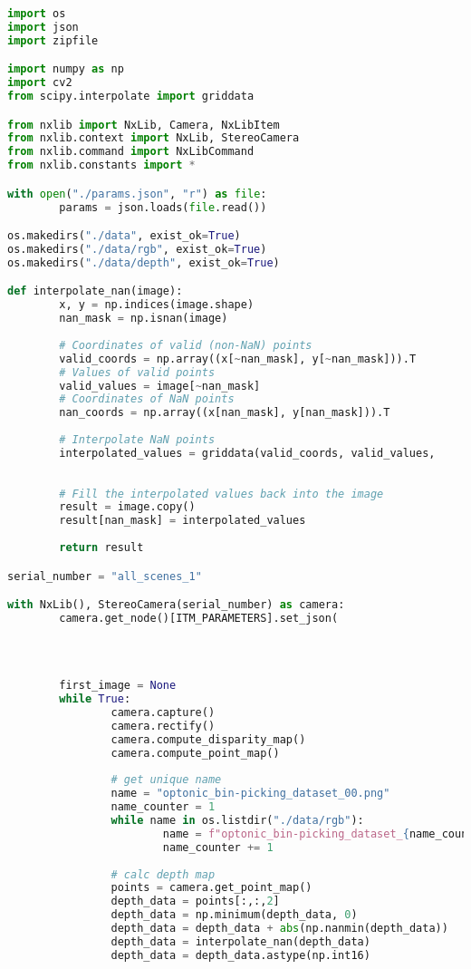 	\clearpage
	\begin{lstlisting}[language=Python,caption=Capturing images from a file camera with depth image scaling using Ensenso Software from Optonic GmbH \cite{optonic}, label=lst:file-camera]
import os
import json
import zipfile

import numpy as np
import cv2
from scipy.interpolate import griddata

from nxlib import NxLib, Camera, NxLibItem
from nxlib.context import NxLib, StereoCamera
from nxlib.command import NxLibCommand
from nxlib.constants import *

with open("./params.json", "r") as file:
		params = json.loads(file.read())

os.makedirs("./data", exist_ok=True)
os.makedirs("./data/rgb", exist_ok=True)
os.makedirs("./data/depth", exist_ok=True)

def interpolate_nan(image):
		x, y = np.indices(image.shape)
		nan_mask = np.isnan(image)
		
		# Coordinates of valid (non-NaN) points
		valid_coords = np.array((x[~nan_mask], y[~nan_mask])).T
		# Values of valid points
		valid_values = image[~nan_mask]
		# Coordinates of NaN points
		nan_coords = np.array((x[nan_mask], y[nan_mask])).T
		
		# Interpolate NaN points
		interpolated_values = griddata(valid_coords, valid_values,
																				nan_coords, method='linear')
		
		# Fill the interpolated values back into the image
		result = image.copy()
		result[nan_mask] = interpolated_values
		
		return result

serial_number = "all_scenes_1"

with NxLib(), StereoCamera(serial_number) as camera:
		camera.get_node()[ITM_PARAMETERS].set_json(
																					json.dumps(params[ITM_PARAMETERS]), 
																					True
																				)
		
		first_image = None
		while True:
				camera.capture()
				camera.rectify()
				camera.compute_disparity_map()
				camera.compute_point_map()
				
				# get unique name
				name = "optonic_bin-picking_dataset_00.png"
				name_counter = 1
				while name in os.listdir("./data/rgb"):
						name = f"optonic_bin-picking_dataset_{name_counter:02}.png"
						name_counter += 1
				
				# calc depth map
				points = camera.get_point_map()
				depth_data = points[:,:,2]
				depth_data = np.minimum(depth_data, 0)
				depth_data = depth_data + abs(np.nanmin(depth_data))
				depth_data = interpolate_nan(depth_data)
				depth_data = depth_data.astype(np.int16)
				

\end{lstlisting}
